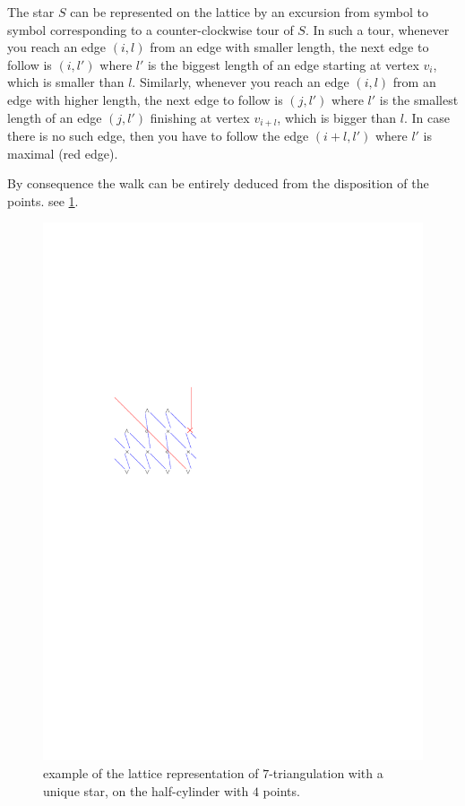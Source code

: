 \documentclass{amsart}
\theoremstyle{remark}
\begin{document}
The star $S$ can be represented on the lattice by an excursion from symbol to symbol corresponding to a counter-clockwise tour of $S$.
In such a tour, whenever you reach an edge $(i,l)$ from an edge with smaller length, the next edge to follow is $(i,l')$ where $l'$ is the biggest length of an edge starting at vertex $v_i$, which is smaller than $l$.
Similarly, whenever you reach an edge $(i,l)$ from an edge with higher length, the next edge to follow is $(j,l')$ where $l'$ is the smallest length of an edge $(j,l')$ finishing at vertex $v_{i+l}$, which is bigger than $l$. In case there is no such edge, then you have to follow the edge $(i+l,l')$ where $l'$ is maximal (red edge).

By consequence the walk can be entirely deduced from the disposition of the points. see \cref{fig:exLattice}.

\begin{figure}\label{fig:exLattice}
\includegraphics[width=.98\linewidth]{latticeRepresentation}
\caption{example of the lattice representation of $7$-triangulation with a unique star, on the half-cylinder with $4$ points.}
\end{figure}
\end{document}
